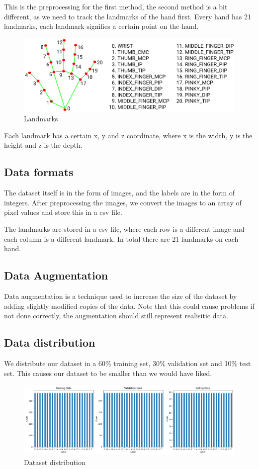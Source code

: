 \documentclass[../paper.tex]{subfiles}
\begin{document}
    This is the preprocessing for the first method, the second method is a bit different, as we need to track the landmarks of the hand first.
    Every hand has 21 landmarks, each landmark signifies a certain point on the hand.
    \begin{figure}[h]
        \centering
        \includegraphics[width=\linewidth]{hand_landmarks}
        \caption{Landmarks}
        \label{fig:landmarks}
    \end{figure}
    Each landmark has a certain x, y and z coordinate, where x is the width, y is the height and z is the depth.

    \subsection{Data formats}
    The dataset itself is in the form of images, and the labels are in the form of integers. 
    After preprocessing the images, we convert the images to an array of pixel values and store this in a csv file. 

    The landmarks are stored in a csv file, where each row is a different image and each column is a different landmark.
    In total there are 21 landmarks on each hand.

    \subsection{Data Augmentation}
    Data augmentation is a technique used to increase the size of the dataset by adding slightly modified copies of the data.
    Note that this could cause problems if not done correctly, the augmentation should still represent realisitic data.

    \subsection{Data distribution}
    We distribute our dataset in a 60\% training set, 30\% validation set and 10\% test set.
    This causes our dataset to be smaller than we would have liked.
    \begin{figure}[h]
        \centering
        \includegraphics[width=\linewidth]{dataset_distribution}
        \caption{Dataset distribution}
        \label{fig:dataset_distribution}
    \end{figure}
\end{document}
